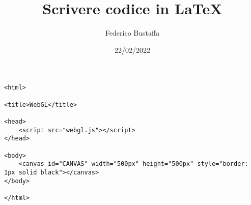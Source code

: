 \documentclass[11pt, a4paper]{article}
\title{Scrivere codice in \LaTeX}
\author{Federico Bustaffa}
\date{22/02/2022}
\begin{document}
\maketitle




\lstset{style=htmlcssjs}

\begin{lstlisting}[language=HTML5]
<html>

<title>WebGL</title>

<head>
	<script src="webgl.js"></script>
</head>

<body>
	<canvas id="CANVAS" width="500px" height="500px" style="border: 1px solid black"></canvas>
</body>

</html>
\end{lstlisting}
\end{document}

